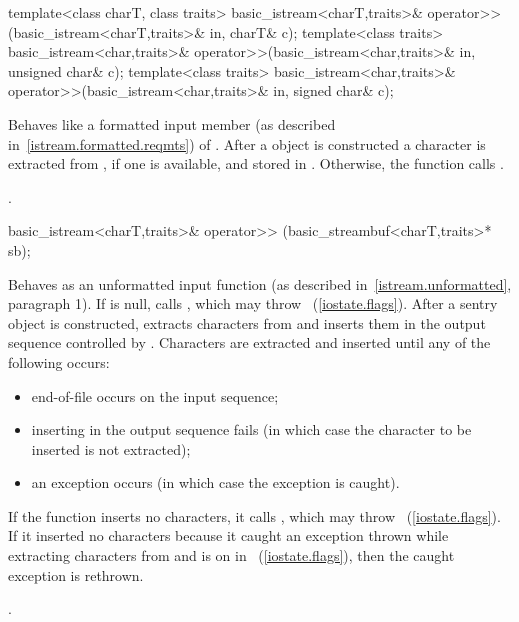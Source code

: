 %
\begin{itemdecl}
template<class charT, class traits>
  basic_istream<charT,traits>& operator>>(basic_istream<charT,traits>& in,
                                          charT& c);
template<class traits>
  basic_istream<char,traits>& operator>>(basic_istream<char,traits>& in,
                                         unsigned char& c);
template<class traits>
  basic_istream<char,traits>& operator>>(basic_istream<char,traits>& in,
                                         signed char& c);
\end{itemdecl}

\begin{itemdescr}
\pnum
\effects
Behaves like a formatted input member (as described in~\ref{istream.formatted.reqmts})
of .
After a
object is constructed
a character is extracted from , if one is available, and stored in .
Otherwise, the function calls
.

\pnum
\returns
{}.
\end{itemdescr}

%
\begin{itemdecl}
basic_istream<charT,traits>& operator>>
  (basic_streambuf<charT,traits>* sb);
\end{itemdecl}

\begin{itemdescr}
\pnum
\effects
Behaves as an unformatted input function (as described
in~\ref{istream.unformatted}, paragraph 1).
If  is null, calls
,
which may throw
~(\ref{iostate.flags}).
After a sentry object is constructed, extracts
characters from
and inserts them in the output sequence controlled by .
Characters are extracted and inserted until any of the following occurs:
\begin{itemize}
\item
end-of-file occurs on the input sequence;
\item
inserting in the output sequence fails
(in which case the character to be inserted is not extracted);
\item
an exception occurs (in which case the exception is caught).
\end{itemize}

\pnum
If the function inserts no characters, it calls
,
which may throw
~(\ref{iostate.flags}).
If it inserted no characters because it caught
an exception thrown while extracting characters from
and
is on in
~(\ref{iostate.flags}),
then the caught exception is rethrown.

\pnum
\returns
{}.
\end{itemdescr}


